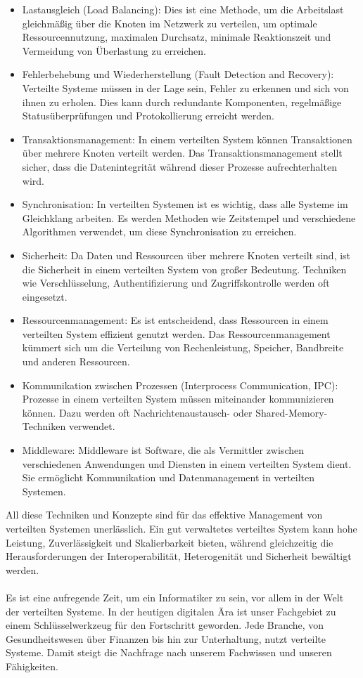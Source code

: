 \begin{itemize} 
\item Lastausgleich (Load Balancing): Dies ist eine Methode, um die Arbeitslast gleichmäßig über die Knoten im Netzwerk zu verteilen, um optimale Ressourcennutzung, maximalen Durchsatz, minimale Reaktionszeit und Vermeidung von Überlastung zu erreichen.
\item Fehlerbehebung und Wiederherstellung (Fault Detection and Recovery): Verteilte Systeme müssen in der Lage sein, Fehler zu erkennen und sich von ihnen zu erholen. Dies kann durch redundante Komponenten, regelmäßige Statusüberprüfungen und Protokollierung erreicht werden.
\item Transaktionsmanagement: In einem verteilten System können Transaktionen über mehrere Knoten verteilt werden. Das Transaktionsmanagement stellt sicher, dass die Datenintegrität während dieser Prozesse aufrechterhalten wird.
\item Synchronisation: In verteilten Systemen ist es wichtig, dass alle Systeme im Gleichklang arbeiten. Es werden Methoden wie Zeitstempel und verschiedene Algorithmen verwendet, um diese Synchronisation zu erreichen.
\item Sicherheit: Da Daten und Ressourcen über mehrere Knoten verteilt sind, ist die Sicherheit in einem verteilten System von großer Bedeutung. Techniken wie Verschlüsselung, Authentifizierung und Zugriffskontrolle werden oft eingesetzt.
\item Ressourcenmanagement: Es ist entscheidend, dass Ressourcen in einem verteilten System effizient genutzt werden. Das Ressourcenmanagement kümmert sich um die Verteilung von Rechenleistung, Speicher, Bandbreite und anderen Ressourcen.
\item Kommunikation zwischen Prozessen (Interprocess Communication, IPC): Prozesse in einem verteilten System müssen miteinander kommunizieren können. Dazu werden oft Nachrichtenaustausch- oder Shared-Memory-Techniken verwendet.
\item Middleware: Middleware ist Software, die als Vermittler zwischen verschiedenen Anwendungen und Diensten in einem verteilten System dient. Sie ermöglicht Kommunikation und Datenmanagement in verteilten Systemen.
\end{itemize} 
All diese Techniken und Konzepte sind für das effektive Management von verteilten Systemen unerlässlich. Ein gut verwaltetes verteiltes System kann hohe Leistung, Zuverlässigkeit und Skalierbarkeit bieten, während gleichzeitig die Herausforderungen der Interoperabilität, Heterogenität und Sicherheit bewältigt werden.
\\\\
Es ist eine aufregende Zeit, um ein Informatiker zu sein, vor allem in der Welt der verteilten Systeme. In der heutigen digitalen Ära ist unser Fachgebiet zu einem Schlüsselwerkzeug für den Fortschritt geworden. Jede Branche, von Gesundheitswesen über Finanzen bis hin zur Unterhaltung, nutzt verteilte Systeme. Damit steigt die Nachfrage nach unserem Fachwissen und unseren Fähigkeiten.

